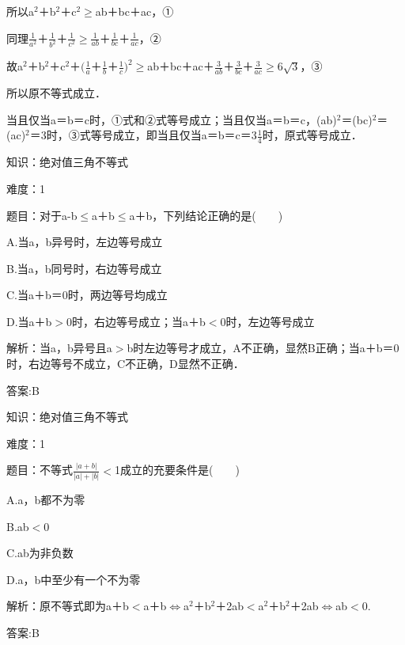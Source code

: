 \documentclass{article} %
\begin{document}
所以a${}^{2}$＋b${}^{2}$＋c${}^{2}$$\mathrm{\ge}$ab＋bc＋ac，①

同理$\frac{1}{a^2}$＋$\frac{1}{b^2}$＋$\frac{1}{c^2}$$\mathrm{\ge}$$\frac{1}{ab}$＋$\frac{1}{bc}$＋$\frac{1}{ac}$，②

故a${}^{2}$＋b${}^{2}$＋c${}^{2}$＋$(\frac{1}{a}$＋$\frac{1}{b}$＋$\frac{1}{c})^2$$\mathrm{\ge}$ab＋bc＋ac＋$\frac{3}{ab}$＋$\frac{3}{bc}$＋$\frac{3}{ac}$$\mathrm{\ge}$6$\sqrt{3}$，③

所以原不等式成立．

当且仅当a＝b＝c时，①式和②式等号成立；当且仅当a＝b＝c，(ab)${}^{2}$＝(bc)${}^{2}$＝(ac)${}^{2}$＝3时，③式等号成立，即当且仅当a＝b＝c＝3$\frac{1}{4}$时，原式等号成立．





知识：绝对值三角不等式

难度：1

题目：对于{\textbar}a{\textbar}-{\textbar}b{\textbar}$\mathrm{\le}${\textbar}a＋b{\textbar}$\mathrm{\le}${\textbar}a{\textbar}＋{\textbar}b{\textbar}，下列结论正确的是(　　)

A.当a，b异号时，左边等号成立

B.当a，b同号时，右边等号成立

C.当a＋b＝0时，两边等号均成立

D.当a＋b$\mathrm{>}$0时，右边等号成立；当a＋b$\mathrm{<}$0时，左边等号成立

解析：当a，b异号且{\textbar}a{\textbar}$\mathrm{>}${\textbar}b{\textbar}时左边等号才成立，A不正确，显然B正确；当a＋b＝0时，右边等号不成立，C不正确，D显然不正确．

答案:B



知识：绝对值三角不等式

难度：1

题目：不等式$\frac{|a+b|}{|a|+|b|}$$\mathrm{<}$1成立的充要条件是(　　)

A.a，b都不为零

B.ab$\mathrm{<}$0

C.ab为非负数

D.a，b中至少有一个不为零

解析：原不等式即为{\textbar}a＋b{\textbar}$\mathrm{<}${\textbar}a{\textbar}＋{\textbar}b{\textbar}$\mathrm{\Leftrightarrow }$a${}^{2}$＋b${}^{2}$＋2ab$\mathrm{<}$a${}^{2}$＋b${}^{2}$＋2{\textbar}ab{\textbar}$\mathrm{\Leftrightarrow }$ab$\mathrm{<}$0.

答案:B
\end{document}
